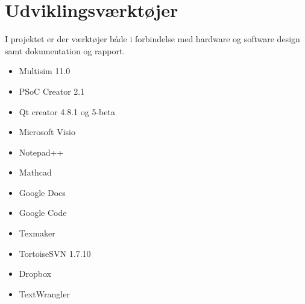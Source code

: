 \section{Udviklingsværktøjer}
I projektet er der værktøjer både i forbindelse med hardware og software design samt dokumentation og rapport.
\begin{itemize}
\item Multisim 11.0
\item PSoC Creator 2.1
\item Qt creator 4.8.1 og 5-beta
\item Microsoft Visio
\item Notepad++
\item Mathcad
\item Google Docs
\item Google Code
\item Texmaker
\item TortoiseSVN 1.7.10
\item Dropbox
\item TextWrangler
\end{itemize}